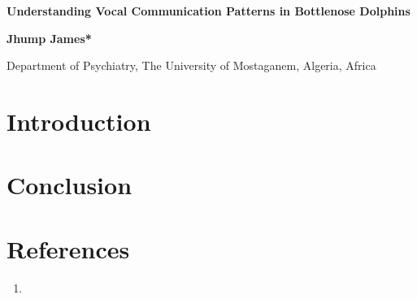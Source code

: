 \documentclass[10pt]{article}
\newcommand{\articletitle}[1]{%
    {\fontsize{16}{22}\selectfont \textbf{#1}}\par
}
\begin{document}
\thispagestyle{firstpage}

\begin{flushleft}
    \articletitle{Understanding Vocal Communication Patterns in Bottlenose Dolphins}
    \vspace{0.1cm}
\end{flushleft}
\begin{flushleft}
    \fontsize{12}{15}\selectfont\color{color_29791}\textbf{Jhump James*}\par
    \vspace{0.2cm}
    \fontsize{11}{12}\selectfont\color{color_29791}Department of Psychiatry, The University of Mostaganem, Algeria, Africa\par
    \vspace{-0.1cm}
\end{flushleft}


\begin{multicols}{2}

\section*{Introduction}

\section*{Conclusion}

\section*{References}
\begin{enumerate}
        \item \href{\VAR{item.parentLink}}{ }
\end{enumerate}

\end{multicols}

\pagestyle{subsequent}
\end{document}
